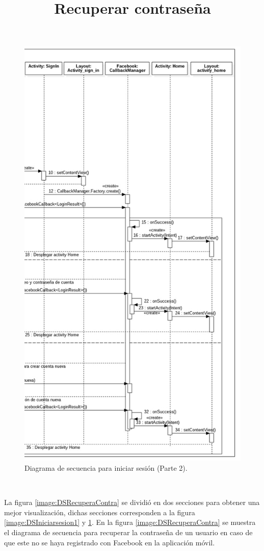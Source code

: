 \FloatBarrier
\begin{figure}[htbp!]
		\centering
			\includegraphics[width=.69 \textwidth]{imagenes/Diagramas_UserApp/Nuevos_diagramas/IniciarSesion_2}
		\caption{Diagrama de secuencia para iniciar sesión (Parte 2).}
		\label{image:DSIniciarsesion2}
\end{figure}
\FloatBarrier

\title{\textbf{Recuperar contraseña}}
\\ \par La figura \ref{image:DSRecuperaContra} se dividió en dos secciones para obtener una mejor visualización, dichas secciones corresponden a la figura \ref{image:DSIniciarsesion1} y \ref{image:DSIniciarsesion2}.
En la figura \ref{image:DSRecuperaContra} se muestra el diagrama de secuencia para recuperar la contraseña de un usuario en caso de que este no se haya registrado con Facebook en la aplicación móvil.


